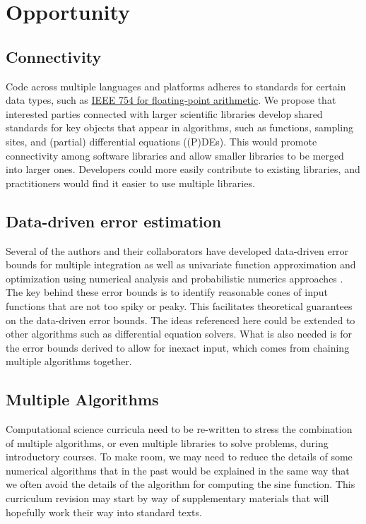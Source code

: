 \documentclass{amsart}
\begin{document}
\section{Opportunity} %
\subsection{Connectivity} 
Code across multiple languages and platforms adheres to standards for certain data types, such as \href{https://en.wikipedia.org/wiki/IEEE_754}{IEEE 754 for floating-point arithmetic}.  We propose that interested parties connected with larger scientific libraries develop shared standards for key objects that appear in algorithms, such as functions, sampling sites, and (partial) differential equations ((P)DEs). This would promote connectivity among software libraries and allow smaller libraries to be merged into larger ones.  Developers could more easily contribute to existing libraries, and practitioners would find it easier to use multiple libraries.

\subsection{Data-driven error estimation} 
Several of the authors and their collaborators have developed data-driven error bounds for multiple integration as well as univariate function approximation and optimization using numerical analysis and probabilistic numerics approaches \cite{ChoEtal17a, HicEtal14b, HicEtal14a, HicJim16a, RatHic19a,JimHic16a}.  The key behind these error bounds is to identify reasonable cones of input functions that are not too spiky or peaky.  This facilitates theoretical guarantees on the data-driven error bounds.  The ideas referenced here could be extended to other algorithms such as differential equation solvers.  What is also needed is for the error bounds derived to allow for inexact input, which comes from chaining multiple algorithms together.

\subsection{Multiple Algorithms}
Computational science curricula need to be re-written to stress the combination of multiple algorithms, or even multiple libraries to solve problems, during introductory courses.  To make room, we may need to reduce the details of some numerical algorithms that in the past would be explained in the same way that we often avoid the details of the algorithm for computing the sine function.  This curriculum revision may start by way of supplementary materials that will hopefully work their way into standard texts.
\end{document}

